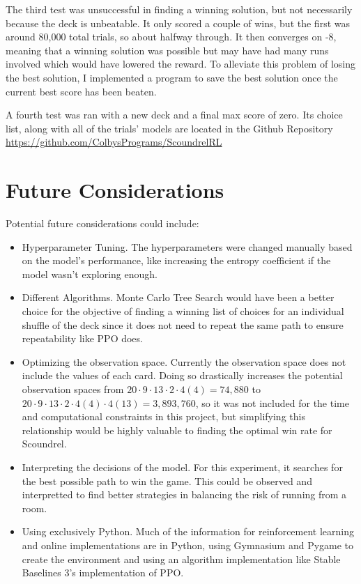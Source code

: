 \documentclass{article}
\begin{document}
The third test was unsuccessful in finding a winning solution, but not necessarily because the deck is unbeatable. It only scored a couple of wins, but the first was around 80,000 total trials, so about halfway through. It then converges on -8, meaning that a winning solution was possible but may have had many runs involved which would have lowered the reward. To alleviate this problem of losing the best solution, I implemented a program to save the best solution once the current best score has been beaten.

A fourth test was ran with a new deck and a final max score of zero. Its choice list, along with all of the trials' models are located in the Github Repository \url{https://github.com/ColbysPrograms/ScoundrelRL}

\newpage
\section{Future Considerations}
Potential future considerations could include:
\begin{itemize}
  \item Hyperparameter Tuning. The hyperparameters were changed manually based on the model's performance, like increasing the entropy coefficient if the model wasn't exploring enough.
  \item Different Algorithms. Monte Carlo Tree Search would have been a better choice for the objective of finding a winning list of choices for an individual shuffle of the deck since it does not need to repeat the same path to ensure repeatability like PPO does.
  \item Optimizing the observation space. Currently the observation space does not include the values of each card. Doing so drastically increases the potential observation spaces from $20 \cdot 9 \cdot 13 \cdot 2 \cdot 4(4) = 74,880$ to $20 \cdot 9 \cdot 13 \cdot 2 \cdot 4(4) \cdot 4(13) = 3,893,760$, so it was not included for the time and computational constraints in this project, but simplifying this relationship would be highly valuable to finding the optimal win rate for Scoundrel.
  \item Interpreting the decisions of the model. For this experiment, it searches for the best possible path to win the game. This could be observed and interpretted to find better strategies in balancing the risk of running from a room.
  \item Using exclusively Python. Much of the information for reinforcement learning and online implementations are in Python, using Gymnasium and Pygame to create the environment and using an algorithm implementation like Stable Baselines 3's implementation of PPO.
\end{itemize}
\end{document}
